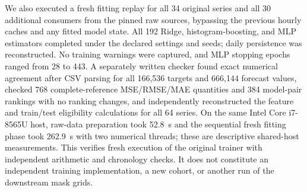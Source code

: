 We also executed a fresh fitting replay for all 34 original series and all 30 additional consumers from the pinned raw sources, bypassing the previous hourly caches and any fitted model state. All 192 Ridge, histogram-boosting, and MLP estimators completed under the declared settings and seeds; daily persistence was reconstructed. No training warnings were captured, and MLP stopping epochs ranged from 28 to 443. A separately written checker found exact numerical agreement after CSV parsing for all 166,536 targets and 666,144 forecast values, checked 768 complete-reference MSE/RMSE/MAE quantities and 384 model-pair rankings with no ranking changes, and independently reconstructed the feature and train/test eligibility calculations for all 64 series. On the same Intel Core i7-8565U host, raw-data preparation took 52.8~s and the sequential fresh fitting phase took 262.9~s with two numerical threads; these are descriptive shared-host measurements. This verifies fresh execution of the original trainer with independent arithmetic and chronology checks. It does not constitute an independent training implementation, a new cohort, or another run of the downstream mask grids.
